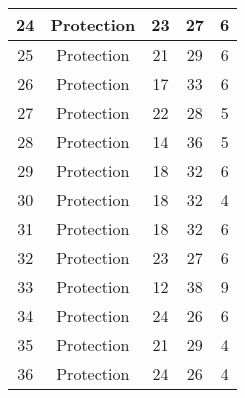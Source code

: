 \documentclass[results.tex]{subfiles}
\begin{document}
\begin{center}
\begin{tabular}{| c || c | c | c | c |}
            \hline
            24                      & Protection                   & 23                     & 27                      & 6                    \\
            \hline
            25                      & Protection                   & 21                     & 29                      & 6                    \\
            \hline
            26                      & Protection                   & 17                     & 33                      & 6                    \\
            \hline
            27                      & Protection                   & 22                     & 28                      & 5                    \\
            \hline
            28                      & Protection                   & 14                     & 36                      & 5                    \\
            \hline
            29                      & Protection                   & 18                     & 32                      & 6                    \\
            \hline
            30                      & Protection                   & 18                     & 32                      & 4                    \\
            \hline
            31                      & Protection                   & 18                     & 32                      & 6                    \\
            \hline
            32                      & Protection                   & 23                     & 27                      & 6                    \\
            \hline
            33                      & Protection                   & 12                     & 38                      & 9                    \\
            \hline
            34                      & Protection                   & 24                     & 26                      & 6                    \\
            \hline
            35                      & Protection                   & 21                     & 29                      & 4                    \\
            \hline
            36                      & Protection                   & 24                     & 26                      & 4                    \\

\end{tabular}
\end{center}
\end{document}
